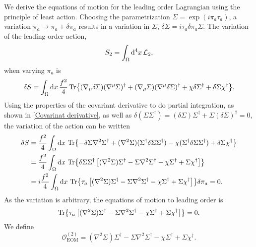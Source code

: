 We derive the equations of motion for the leading order Lagrangian using the principle of least action.
Choosing the parametrization $\Sigma = \exp(i \pi_a \tau_a)$, a variation $\pi_a \rightarrow \pi_a + \delta \pi_a$ results in a variation in $\Sigma$, $\delta \Sigma = i \tau_a \delta \pi_a \Sigma $.
The variation of the leading order action,
\begin{equation}
    S_2 = \int_\Omega \dd^4x \, \mathcal{L}_2,
\end{equation}
when varying $\pi_a$ is 
\begin{align*}
    \delta S = \int_\Omega \dd x \, \frac{f^2}{4}
    \Tr{
        (\nabla_\mu \delta \Sigma) (\nabla^\mu \Sigma)^\dagger
        + (\nabla_\mu \Sigma) (\nabla^\mu \delta \Sigma)^\dagger
        + \chi \delta \Sigma^\dagger + \delta \Sigma \chi^\dagger
    }.
\end{align*}
Using the properties of the covariant derivative to do partial integration, as shown in \autoref{Covarinat derivative}, as well as $\delta(\Sigma \Sigma^\dagger) = (\delta\Sigma)\Sigma^\dagger + \Sigma (\delta \Sigma)^\dagger = 0$, the variation of the action can be written
\begin{align*}
    \delta S 
    & = \frac{f^2}{4} \int_\Omega \dd x\, 
    \Tr{
        - \delta \Sigma \nabla^2 \Sigma^\dagger
        + (\nabla^2 \Sigma) (\Sigma^\dagger \delta \Sigma \Sigma^\dagger)
        - \chi (\Sigma^\dagger \delta \Sigma \Sigma^\dagger)
        + \delta \Sigma \chi^\dagger
    } \\
    & = 
    \frac{f^2}{4} \int_\Omega \dd x\, 
    \Tr{
        \delta \Sigma \Sigma^\dagger 
        \left[
            (\nabla^2 \Sigma)\Sigma^\dagger
            - \Sigma \nabla^2 \Sigma^\dagger
            - \chi \Sigma^\dagger
            + \Sigma \chi^\dagger
        \right]
        } \\
    & = 
    i \frac{f^2}{4} \int_\Omega \dd x\, 
    \Tr{\tau_a 
    \left[
         (\nabla^2 \Sigma)\Sigma^\dagger
        - \Sigma \nabla^2 \Sigma^\dagger
        - \chi \Sigma^\dagger
        + \Sigma \chi^\dagger
    \right]
    } 
    \delta \pi_a = 0.
\end{align*}  
As the variation is arbitrary, the equations of motion to leading order is
\begin{equation}
    \Tr{
        \tau_a 
        \left[
            (\nabla^2 \Sigma)\Sigma^\dagger
            - \Sigma \nabla^2 \Sigma^\dagger
            - \chi \Sigma^\dagger
            + \Sigma \chi^\dagger
        \right]
    } = 0.
\end{equation}
We define
\begin{equation}
    \mathcal O_\text{EOM}^{(2)}
    = 
    (\nabla^2 \Sigma)\Sigma^\dagger
    - \Sigma \nabla^2 \Sigma^\dagger
    - \chi \Sigma^\dagger
    + \Sigma \chi^\dagger.
\end{equation}


